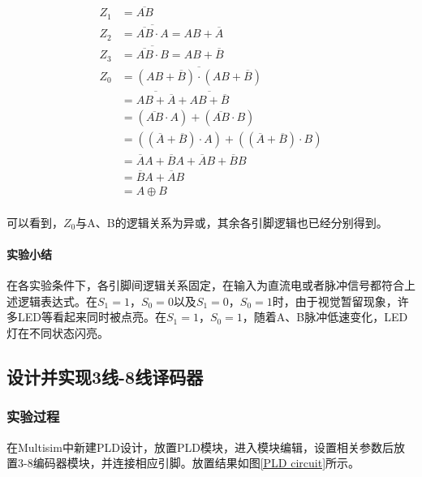 \documentclass[UTF8]{ctexart}
\numberwithin{figure}{subsection}
\numberwithin{table}{subsection}
\numberwithin{equation}{subsection}
\begin{document}
\begin{align*}
    Z_1 & = \overline{AB} \\
    Z_2 & = \overline{\overline{AB} \cdot A} = AB + \overline{A} \\
    Z_3 & = \overline{\overline{AB} \cdot B} = AB + \overline{B} \\
    Z_0 & = \overline{\left(AB + \overline{B}\right)\cdot \left(AB + \overline{B}\right)} \\
        & =\overline{AB +\overline{A}} + \overline{AB +\overline{B}} \\
        & = \left(\overline{AB}\cdot A\right) + \left(\overline{AB}\cdot B\right) \\
        & = \left(\left(\overline{A} + \overline{B}\right)\cdot A\right) + \left(\left(\overline{A} + \overline{B}\right)\cdot B\right) \\
        & = \overline{A}A + \overline{B}A + \overline{A}B + \overline{B}B \\
        & = \overline{B}A + \overline{A}B \\
        & = A \oplus B \\
\end{align*}

可以看到，\(Z_0\)与A、B的逻辑关系为异或，其余各引脚逻辑也已经分别得到。

\paragraph{实验小结} 在各实验条件下，各引脚间逻辑关系固定，在输入为直流电或者脉冲信号都符合上述逻辑表达式。在\(S_1 = 1 ，S_0 = 0\)以及\(S_1 = 0 ，S_0 = 1\)时，由于视觉暂留现象，许多LED等看起来同时被点亮。在\(S_1 = 1 ，S_0 = 1\)，随着A、B脉冲低速变化，LED灯在不同状态闪亮。


\subsection{设计并实现3线-8线译码器}
\subsubsection{实验过程}
\par 在Multisim中新建PLD设计，放置PLD模块，进入模块编辑，设置相关参数后放置3-8编码器模块，并连接相应引脚。放置结果如图\ref{PLD circuit}所示。
\end{document}
